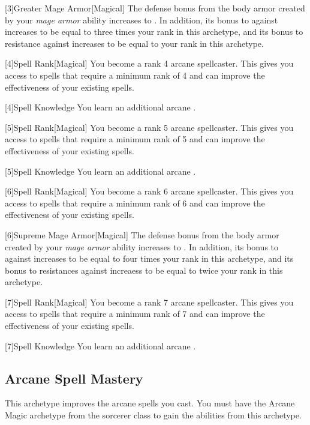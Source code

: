         [3]{Greater Mage Armor}[Magical]
        The defense bonus from the body armor created by your \textit{mage armor} ability increases to .
        In addition, its bonus to  against  increases to be equal to three times your rank in this archetype, and its bonus to resistance against  increases to be equal to your rank in this archetype.

        [4]{Spell Rank}[Magical] You become a rank 4 arcane spellcaster.
        This gives you access to spells that require a minimum rank of 4 and can improve the effectiveness of your existing spells.

        [4]{Spell Knowledge} You learn an additional arcane .

        [5]{Spell Rank}[Magical] You become a rank 5 arcane spellcaster.
        This gives you access to spells that require a minimum rank of 5 and can improve the effectiveness of your existing spells.

        [5]{Spell Knowledge} You learn an additional arcane .

        [6]{Spell Rank}[Magical] You become a rank 6 arcane spellcaster.
        This gives you access to spells that require a minimum rank of 6 and can improve the effectiveness of your existing spells.

        [6]{Supreme Mage Armor}[Magical]
        The defense bonus from the body armor created by your \textit{mage armor} ability increases to .
        In addition, its bonus to  against  increases to be equal to four times your rank in this archetype, and its bonus to resistances against  increaess to be equal to twice your rank in this archetype.

        [7]{Spell Rank}[Magical] You become a rank 7 arcane spellcaster.
        This gives you access to spells that require a minimum rank of 7 and can improve the effectiveness of your existing spells.

        [7]{Spell Knowledge} You learn an additional arcane .

    \newpage
    \subsection{Arcane Spell Mastery}
        This archetype improves the arcane spells you cast.
        You must have the Arcane Magic archetype from the sorcerer class to gain the abilities from this archetype.

